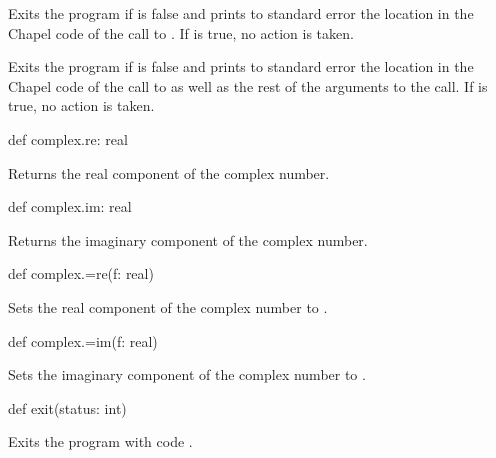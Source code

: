\begin{protohead}
def assert(test: bool) {
\end{protohead}
\begin{protobody}
Exits the program if  is false and prints to standard error
the location in the Chapel code of the call to .
If  is true, no action is taken.
\end{protobody}

\begin{protohead}
def assert(test: bool, args ...?numArgs) {
\end{protohead}
\begin{protobody}
Exits the program if  is false and prints to standard error
the location in the Chapel code of the call to  as well
as the rest of the arguments to the call.  If  is true, no
action is taken.
\end{protobody}

\begin{protohead}
def complex.re: real
\end{protohead}
\begin{protobody}
Returns the real component of the complex number.
\end{protobody}

\begin{protohead}
def complex.im: real
\end{protohead}
\begin{protobody}
Returns the imaginary component of the complex number.
\end{protobody}

\begin{protohead}
def complex.=re(f: real)
\end{protohead}
\begin{protobody}
Sets the real component of the complex number to .
\end{protobody}

\begin{protohead}
def complex.=im(f: real)
\end{protohead}
\begin{protobody}
Sets the imaginary component of the complex number to .
\end{protobody}

\begin{protohead}
def exit(status: int)
\end{protohead}
\begin{protobody}
Exits the program with code .
\end{protobody}

